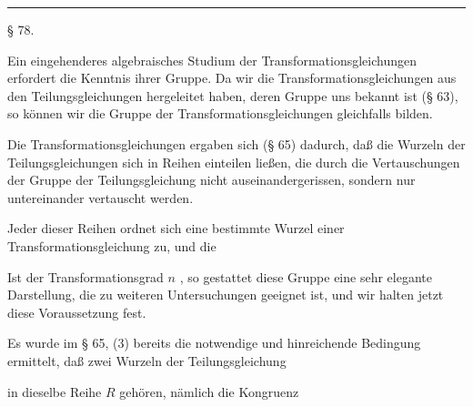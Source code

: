 \begin{center}

\end{center}

\noindent\rule{0.3\textwidth}{0.4pt}

\begin{center}
§ 78.

\end{center}

Ein eingehenderes algebraisches Studium der Transformationsgleichungen erfordert die Kenntnis ihrer  Gruppe. Da
wir die Transformationsgleichungen aus den Teilungsgleichungen
hergeleitet haben, deren Gruppe uns bekannt ist (§ 63), so können
wir die Gruppe der Transformationsgleichungen gleichfalls bilden.

Die Transformationsgleichungen ergaben sich (§ 65) dadurch,
daß die Wurzeln der Teilungsgleichungen sich in Reihen einteilen ließen, die durch die Vertauschungen der Gruppe der
Teilungsgleichung nicht auseinandergerissen, sondern nur untereinander vertauscht werden.

Jeder dieser Reihen ordnet sich eine bestimmte Wurzel einer
Transformationsgleichung zu, und die 

Ist der Transformationsgrad $n$ ,
so gestattet diese Gruppe eine sehr elegante Darstellung, die zu
weiteren Untersuchungen geeignet ist, und wir halten jetzt diese
Voraussetzung fest.

Es wurde im § 65, (3) bereits die notwendige und hinreichende
Bedingung ermittelt, daß zwei Wurzeln der Teilungsgleichung


in dieselbe Reihe $R$ gehören, nämlich die Kongruenz

